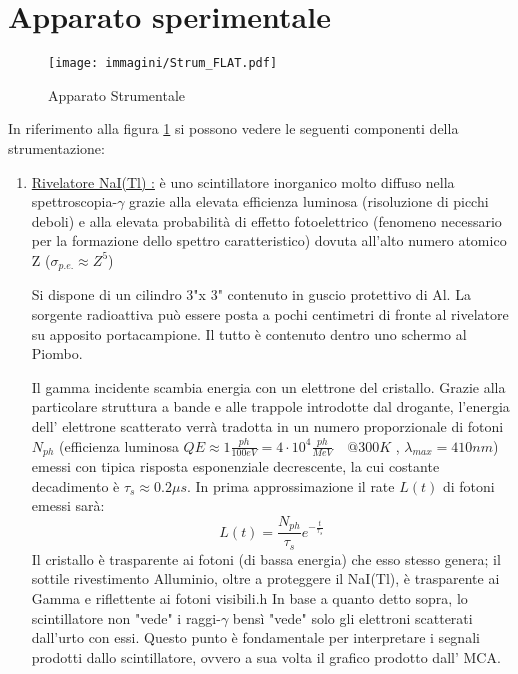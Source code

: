\documentclass[12pt,a4paper,openright,twoside]{article}
\numberwithin{equation}{section} %
\begin{document}
\section{Apparato sperimentale} \label{sper}

\begin{figure}[hbtp]
\centering
\texttt{[image: immagini/Strum\_FLAT.pdf]}
\caption{Apparato Strumentale}
\label{strum}
\end{figure}


In riferimento alla figura \ref{strum} si possono vedere le seguenti componenti della strumentazione:
\begin{enumerate}
\item \underline{Rivelatore NaI(Tl) :} è uno scintillatore inorganico molto diffuso nella spettroscopia-$\gamma$ grazie alla elevata efficienza luminosa (risoluzione di picchi deboli) e alla elevata probabilità di effetto fotoelettrico (fenomeno necessario per la formazione dello spettro caratteristico) dovuta all'alto numero atomico Z ($\sigma_{p.e.} \approx Z^5$)

 Si dispone di un cilindro 3"x 3"  contenuto in guscio protettivo di Al. La sorgente radioattiva può essere posta a pochi centimetri di fronte al rivelatore su apposito portacampione. Il tutto è contenuto dentro uno schermo al Piombo.


 Il gamma incidente scambia energia con un elettrone del cristallo. Grazie alla particolare struttura a bande e alle trappole introdotte dal drogante, l'energia dell' elettrone scatterato verrà tradotta in un numero proporzionale di fotoni $N_{ph}$ (efficienza luminosa $QE \approx 1 \frac{ph}{100eV} = 4 \cdot 10^4 \frac{ph}{MeV}  \quad @ 300 K$ , $\lambda_ {max} = 410 nm $) emessi con tipica risposta esponenziale decrescente, la cui costante decadimento è $\tau_{s} \approx 0.2 \mu s$. In prima approssimazione il rate $L(t)$ di fotoni emessi sarà:
\begin{equation}
L(t)=\frac{N_{ph}}{\tau_{s}}e^{- \frac{t}{\tau_{s}}}
\end{equation}
Il cristallo è trasparente ai fotoni (di bassa energia) che esso stesso genera; il sottile rivestimento Alluminio, oltre a proteggere il NaI(Tl), è trasparente ai Gamma e riflettente ai fotoni visibili.h
In base a quanto detto sopra, lo scintillatore non "vede" i raggi-$\gamma$ bensì "vede" solo gli elettroni scatterati dall'urto con essi.
Questo punto è fondamentale per interpretare i segnali prodotti dallo scintillatore, ovvero a sua volta il grafico prodotto dall' MCA.


\end{enumerate}
\end{document}
